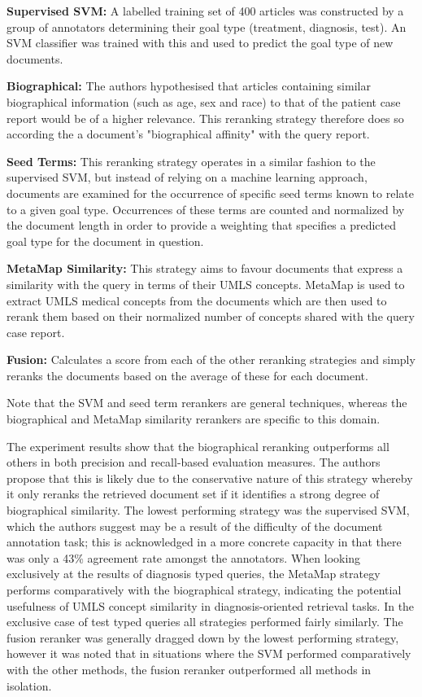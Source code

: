 \documentclass[a4paper]{report}
\begin{document}
\textbf{Supervised SVM:}
A labelled training set of 400 articles was constructed by a group of annotators determining their goal type (treatment, diagnosis, test). An SVM classifier was trained with this and used to predict the goal type of new documents.

\textbf{Biographical:}
The authors hypothesised that articles containing similar biographical information (such as age, sex and race) to that of the patient case report would be of a higher relevance. This reranking strategy therefore does so according the a document's "biographical affinity" with the query report.

\textbf{Seed Terms:}
This reranking strategy operates in a similar fashion to the supervised SVM, but instead of relying on a machine learning approach, documents are examined for the occurrence of specific seed terms known to relate to a given goal type. Occurrences of these terms are counted and normalized by the document length in order to provide a weighting that specifies a predicted goal type for the document in question.

\textbf{MetaMap Similarity:}
This strategy aims to favour documents that express a similarity with the query in terms of their UMLS concepts. MetaMap is used to extract UMLS medical concepts from the documents which are then used to rerank them based on their normalized number of concepts shared with the query case report.

\textbf{Fusion:}
Calculates a score from each of the other reranking strategies and simply reranks the documents based on the average of these for each document.

Note that the SVM and seed term rerankers are general techniques, whereas the biographical and MetaMap similarity rerankers are specific to this domain.

The experiment results show that the biographical reranking outperforms all others in both precision and recall-based evaluation measures. The authors propose that this is likely due to the conservative nature of this strategy whereby it only reranks the retrieved document set if it identifies a strong degree of biographical similarity. The lowest performing strategy was the supervised SVM, which the authors suggest may be a result of the difficulty of the document annotation task; this is acknowledged in a more concrete capacity in that there was only a 43\% agreement rate amongst the annotators. When looking exclusively at the results of diagnosis typed queries, the MetaMap strategy performs comparatively with the biographical strategy, indicating the potential usefulness of UMLS concept similarity in diagnosis-oriented retrieval tasks. In the exclusive case of test typed queries all strategies performed fairly similarly. The fusion reranker was generally dragged down by the lowest performing strategy, however it was noted that in situations where the SVM performed comparatively with the other methods, the fusion reranker outperformed all methods in isolation.
\end{document}
